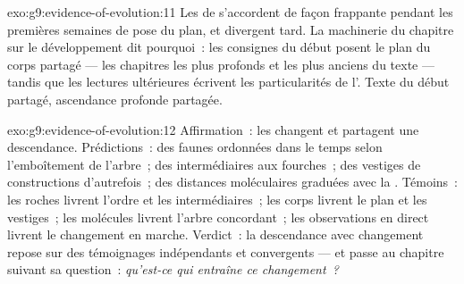 \begin{solution}{exo:g9:evidence-of-evolution:11}
Les  de  s'accordent de façon frappante
pendant les premières semaines de pose du plan, et divergent
tard. La machinerie du chapitre sur le développement dit
pourquoi~: les consignes du début posent le plan du corps
partagé --- les chapitres les plus profonds et les plus
anciens du texte --- tandis que les lectures ultérieures
écrivent les particularités de l'. Texte du début
partagé, ascendance profonde partagée.
\end{solution}

\begin{solution}{exo:g9:evidence-of-evolution:12}
Affirmation~: les  changent et partagent une
descendance. Prédictions~: des faunes ordonnées dans le
temps selon l'emboîtement de l'arbre~; des intermédiaires
aux fourches~; des vestiges de constructions d'autrefois~;
des distances moléculaires graduées avec la .
Témoins~: les roches livrent l'ordre et les
intermédiaires~; les corps livrent le plan et les
vestiges~; les molécules livrent l'arbre concordant~; les
observations en direct livrent le changement en marche.
Verdict~: la descendance avec changement repose sur des
témoignages indépendants et convergents --- et passe au
chapitre suivant sa question~: \emph{qu'est-ce qui entraîne
ce changement~?}
\end{solution}

